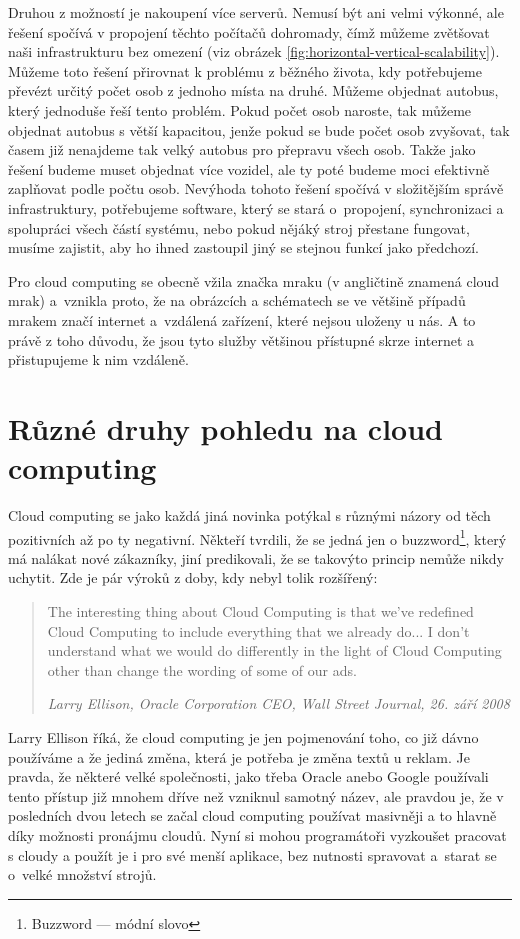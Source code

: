 Druhou z možností je nakoupení více serverů. Nemusí být ani velmi výkonné, ale řešení spočívá v propojení těchto počítačů dohromady, čímž můžeme zvětšovat naši infrastrukturu bez omezení (viz obrázek \ref{fig:horizontal-vertical-scalability}). Můžeme toto řešení přirovnat k problému z běžného života, kdy potřebujeme převézt určitý počet osob z jednoho místa na druhé. Můžeme objednat autobus, který jednoduše řeší tento problém. Pokud počet osob naroste, tak můžeme objednat autobus s větší kapacitou, jenže pokud se bude počet osob zvyšovat, tak časem již nenajdeme tak velký autobus pro přepravu všech osob. Takže jako řešení budeme muset objednat více vozidel, ale ty poté budeme moci efektivně zaplňovat podle počtu osob. Nevýhoda tohoto řešení spočívá v složitějším správě infrastruktury, potřebujeme software, který se stará o~propojení, synchronizaci a spolupráci všech částí systému, nebo pokud nějáký stroj přestane fungovat, musíme zajistit, aby ho ihned zastoupil jiný se stejnou funkcí jako předchozí.

Pro cloud computing se obecně vžila značka mraku (v angličtině znamená cloud mrak) a~vznikla proto, že na obrázcích a schématech se ve většině případů mrakem značí internet a~vzdálená zařízení, které nejsou uloženy u nás. A to právě z toho důvodu, že jsou tyto služby většinou přístupné skrze internet a přistupujeme k nim vzdáleně.

\section{Různé druhy pohledu na cloud computing}
Cloud computing se jako každá jiná novinka potýkal s různými názory od těch pozitivních až po ty negativní. Někteří tvrdili, že se jedná jen o buzzword\footnote{Buzzword --- módní slovo}, který má nalákat nové zákazníky, jiní predikovali, že se takovýto princip nemůže nikdy uchytit. Zde je pár výroků  z doby, kdy nebyl tolik rozšířený:

\begin{quotation}
The interesting thing about Cloud Computing is that we’ve redefined Cloud Computing to include everything that we already do...  I don’t understand what we would do differently in the light of Cloud Computing other than change the wording of some of our ads.

\em Larry Ellison, Oracle Corporation CEO, Wall Street Journal, 26. září 2008
\end{quotation}

Larry Ellison říká, že cloud computing je jen pojmenování toho, co již dávno používáme a že jediná změna, která je potřeba je změna textů u reklam. Je pravda, že některé velké společnosti, jako třeba Oracle anebo Google používali tento přístup již mnohem dříve než vzniknul samotný název, ale pravdou je, že v posledních dvou letech se začal cloud computing používat masivněji a to hlavně díky možnosti pronájmu cloudů. Nyní si mohou programátoři vyzkoušet pracovat s cloudy a použít je i pro své menší aplikace, bez nutnosti spravovat a~starat se o~velké množství strojů.

